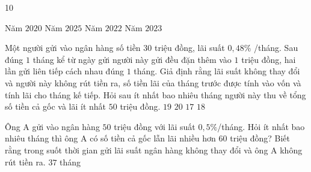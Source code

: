 \begin{indapan}{10}
\begin{ex}
	\choice
	{Năm $2020$}
	{Năm $2025$}
	{Năm $2022$}
	{\True Năm $2023$}
\end{ex}
\begin{ex}
	Một người gửi vào ngân hàng số tiền $30$ triệu đồng, lãi suất $0{,}48\%$ /tháng. Sau đúng $1$ tháng kể từ ngày gửi người này gửi đều đặn thêm vào $1$ triệu đồng, hai lần gửi liên tiếp cách nhau đúng $1$ tháng. Giả định rằng lãi suất không thay đổi và người này không rút tiền ra, số tiền lãi của tháng trước được tính vào vốn và tính lãi cho tháng kế tiếp. Hỏi sau ít nhất bao nhiêu tháng người này thu về tổng số tiền cả gốc và lãi ít nhất $50$ triệu đồng.
	\choice
	{$19$}
	{$20$}
	{$17$}
	{\True $18$}
\end{ex}
\begin{ex}
	Ông A gửi vào ngân hàng $50$ triệu đồng với lãi suất $0{,}5\%$/tháng. Hỏi ít nhất bao nhiêu tháng thì ông A có số tiền cả gốc lẫn lãi nhiều hơn $60$ triệu đồng? Biết rằng trong suốt thời gian gửi lãi suất ngân hàng không thay đổi và ông A không rút tiền ra.
	\choice
	{\True $37$ tháng}

\end{ex}
\end{indapan}
